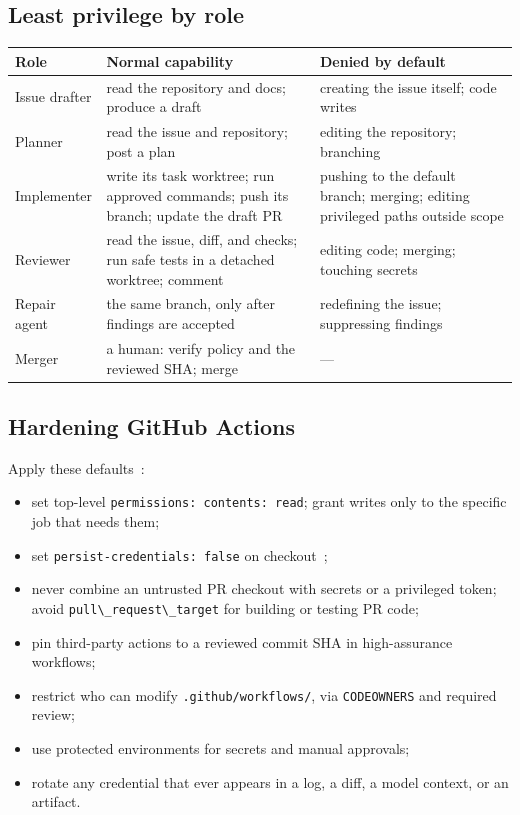 \documentclass[11pt]{article}
\newcommand{\co}[1]{\lstinline[basicstyle=\ttfamily\color{gwInk}]{#1}}
\begin{document}
\subsection{Least privilege by role}

\begin{center}
\begin{tabularx}{\textwidth}{@{}l Y Y@{}}
\toprule
\textbf{Role} & \textbf{Normal capability} & \textbf{Denied by default} \\
\midrule
Issue drafter & read the repository and docs; produce a draft & creating the issue itself;
  code writes \\
Planner & read the issue and repository; post a plan & editing the repository; branching \\
Implementer & write its task worktree; run approved commands; push its branch; update the
  draft PR & pushing to the default branch; merging; editing privileged paths outside scope \\
Reviewer & read the issue, diff, and checks; run safe tests in a detached worktree; comment &
  editing code; merging; touching secrets \\
Repair agent & the same branch, only after findings are accepted & redefining the issue;
  suppressing findings \\
Merger & a human: verify policy and the reviewed SHA; merge & --- \\
\bottomrule
\end{tabularx}
\end{center}

\subsection{Hardening GitHub Actions}

Apply these defaults~\cite{github2026secureactions}:

\begin{itemize}
  \item set top-level \co{permissions: contents: read}; grant writes only to the specific job
    that needs them;
  \item set \co{persist-credentials: false} on checkout~\cite{github2026checkout};
  \item never combine an untrusted PR checkout with secrets or a privileged token; avoid
    \co{pull\_request\_target} for building or testing PR code;
  \item pin third-party actions to a reviewed commit SHA in high-assurance workflows;
  \item restrict who can modify \co{.github/workflows/}, via \co{CODEOWNERS} and required review;
  \item use protected environments for secrets and manual approvals;
  \item rotate any credential that ever appears in a log, a diff, a model context, or an
    artifact.
\end{itemize}
\end{document}
